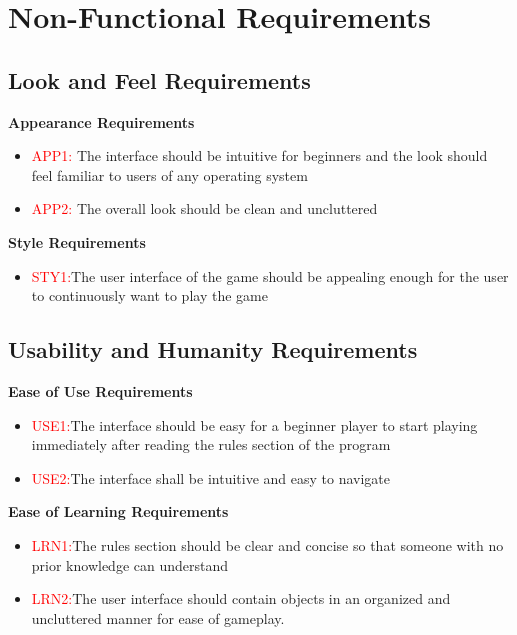 \documentclass[12pt]{article}
\begin{document}
	\section{Non-Functional Requirements}
	\subsection{Look and Feel Requirements}
	\textbf{Appearance Requirements} 
	\begin{itemize}
	\item 	\textcolor{red}{APP1:} The interface should be intuitive for beginners and the look should feel 					familiar to users of any operating system
	\item	\textcolor{red}{APP2:} The overall look should be clean and uncluttered
	\end{itemize}
	
	\textbf{Style Requirements}
 	\begin{itemize}
 	\item 	\textcolor{red}{STY1:}The user interface of the game should be appealing enough for the user to 					continuously want to play the game
	\end{itemize}
	\subsection{Usability and Humanity Requirements}
	\textbf{Ease of Use Requirements}
	\begin{itemize}
	\item 	\textcolor{red}{USE1:}The interface should be easy for a beginner player to start playing immediately 			after reading the rules section of the program
	\item 	\textcolor{red}{USE2:}The interface shall be intuitive and easy to navigate 
	\end{itemize}
	\textbf{Ease of Learning Requirements}
	\begin{itemize}
	\item 	\textcolor{red}{LRN1:}The rules section should be clear and concise so that someone with no prior 				knowledge can understand
	\item 	\textcolor{red}{LRN2:}The user interface should contain objects in an organized and uncluttered 					manner for ease of gameplay.
	\end{itemize}
	
\end{document}
